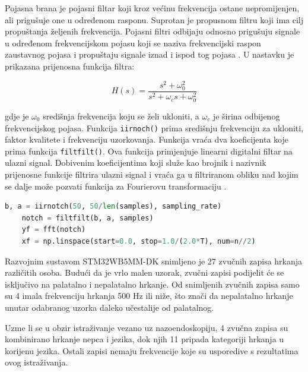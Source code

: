 Pojasna brana je pojasni filtar koji kroz većinu frekvencija ostane nepromijenjen, ali prigušuje one u određenom rasponu. Suprotan je propusnom filtru koji ima cilj propuštanja željenih frekvencija. Pojasni filtri odbijaju odnosno prigušuju signale u određenom frekvencijskom pojasu koji se naziva frekvencijski raspon zaustavnog pojasa i propuštaju signale iznad i ispod tog pojasa \cite{notch}.  U nastavku je prikazana prijenosna funkcija filtra:

\begin{equation}
	H(s) = \dfrac{s^2 + \omega_0^2}{s^2 + \omega_c s + \omega_0^2}
\end{equation}

gdje je \(\omega_0\) središnja frekvencija koju se želi ukloniti, a \(\omega_c\) je širina odbijenog frekvencijskog pojasa.  Funkcija \lstinline|iirnoch()| prima središnju frekvenciju za ukloniti, faktor kvalitete i frekvenciju uzorkovanja. Funkcija vraća dva koeficijenta koje prima funkcija \lstinline|filtfilt()|. Ova funkcija primjenjuje linearni digitalni filtar na ulazni signal. Dobivenim koeficijentima koji služe kao brojnik i nazivnik prijenosne funkcije filtrira ulazni signal i vraća ga u filtriranom obliku nad kojim se dalje može pozvati funkcija za Fourierovu transformaciju \cite{scipy}. 

\begin{lstlisting}[language=Python, caption={Primjena \textit{notch} filtra i Fourierove transformacije}]
	b, a = iirnotch(50, 50/len(samples), sampling_rate)
	notch = filtfilt(b, a, samples)
	yf = fft(notch)
	xf = np.linspace(start=0.0, stop=1.0/(2.0*T), num=n//2)
\end{lstlisting}

Razvojnim sustavom STM32WB5MM-DK snimljeno je 27 zvučnih zapisa hrkanja različitih osoba. Budući da je vrlo malen uzorak, zvučni zapisi podijelit će se isključivo na palatalno i nepalatalno hrkanje. Od snimljenih zvučnih zapisa samo su 4 imala frekvenciju hrkanja 500 Hz ili niže, što znači da nepalatalno hrkanje unutar odabranog uzorka daleko učestalije od palatalnog.

Uzme li se u obzir istraživanje vezano uz nazoendoskopiju, 4 zvučna zapisa su kombinirano hrkanje nepca i jezika, dok njih 11 pripada kategoriji hrkanja u korijenu jezika. Ostali zapisi nemaju frekvencije koje su usporedive s rezultatima ovog istraživanja.